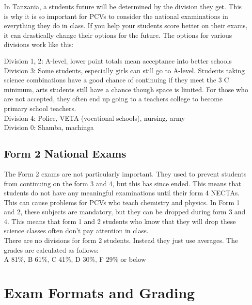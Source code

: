       In Tanzania, a students future will be determined by the division they get.  This is why it is so important for PCVs to consider the national examinations in everything they do in class.  If you help your students score better on their exams, it can drastically change their options for the future.  The options for various divisions work like this: \\
\begin{flushleft}
Division 1, 2: A-level, lower point totals mean acceptance into better schools\\
Division 3: Some students, especially girls can still go to A-level.  Students taking science combinations have a good chance of continuing if they meet the 3 C minimum, arts students still have a chance though space is limited.  For those who are not accepted, they often end up going to a teachers college to become primary school teachers.\\
Division 4: Police, VETA (vocational schools), nursing, army\\
Division 0: Shamba, machinga\\
\end{flushleft}

\subsection{Form 2 National Exams }
      The Form 2 exams are not particularly important.  They used to prevent students from continuing on the form 3 and 4, but this has since ended.  This means that students do not have any meaningful examinations until their form 4 NECTAs. This can cause problems for PCVs who teach chemistry and physics.  In Form 1 and 2, these subjects are mandatory, but they can be dropped during form 3 and 4.  This means that form 1 and 2 students who know that they will drop these science classes often don't pay attention in class. \\

      There are no divisions for form 2 students.  Instead they just use averages.  The grades are calculated as follows:\\

      A 81\%, B 61\%, C 41\%, D 30\%, F 29\% or below\\
       
\section{Exam Formats and Grading} 

